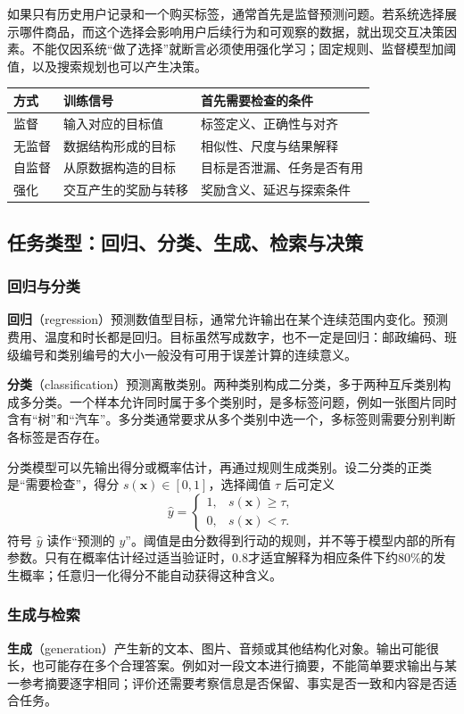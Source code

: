 \documentclass[UTF8,fontset=none,zihao=-4,a4paper]{ctexart}
\newcommand{\term}[1]{\textbf{#1}}
\numberwithin{equation}{section}
\numberwithin{figure}{section}
\begin{document}
如果只有历史用户记录和一个购买标签，通常首先是监督预测问题。若系统选择展示哪件商品，而这个选择会影响用户后续行为和可观察的数据，就出现交互决策因素。不能仅因系统“做了选择”就断言必须使用强化学习；固定规则、监督模型加阈值，以及搜索规划也可以产生决策。

\begin{center}
\begin{tabularx}{\linewidth}{l Y Y}
\toprule
方式 & 训练信号 & 首先需要检查的条件\\\midrule
监督 & 输入对应的目标值 & 标签定义、正确性与对齐\\
无监督 & 数据结构形成的目标 & 相似性、尺度与结果解释\\
自监督 & 从原数据构造的目标 & 目标是否泄漏、任务是否有用\\
强化 & 交互产生的奖励与转移 & 奖励含义、延迟与探索条件\\
\bottomrule
\end{tabularx}
\end{center}

\subsection{任务类型：回归、分类、生成、检索与决策}
\subsubsection{回归与分类}
\term{回归}（regression）预测数值型目标，通常允许输出在某个连续范围内变化。预测费用、温度和时长都是回归。目标虽然写成数字，也不一定是回归：邮政编码、班级编号和类别编号的大小一般没有可用于误差计算的连续意义。

\term{分类}（classification）预测离散类别。两种类别构成二分类，多于两种互斥类别构成多分类。一个样本允许同时属于多个类别时，是多标签问题，例如一张图片同时含有“树”和“汽车”。多分类通常要求从多个类别中选一个，多标签则需要分别判断各标签是否存在。

分类模型可以先输出得分或概率估计，再通过规则生成类别。设二分类的正类是“需要检查”，得分 $s(\symbf{x})\in[0,1]$，选择阈值 $\tau$ 后可定义
\[
 \widehat y=\begin{cases}
 1,&s(\symbf{x})\geq\tau,\\
 0,&s(\symbf{x})<\tau.
 \end{cases}
\]
符号 $\widehat y$ 读作“预测的 $y$”。阈值是由分数得到行动的规则，并不等于模型内部的所有参数。只有在概率估计经过适当验证时，0.8才适宜解释为相应条件下约80\%的发生概率；任意归一化得分不能自动获得这种含义。

\subsubsection{生成与检索}
\term{生成}（generation）产生新的文本、图片、音频或其他结构化对象。输出可能很长，也可能存在多个合理答案。例如对一段文本进行摘要，不能简单要求输出与某一参考摘要逐字相同；评价还需要考察信息是否保留、事实是否一致和内容是否适合任务。
\end{document}
